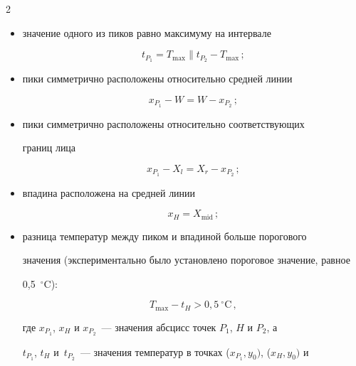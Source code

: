 \begin{multicols}{2}
\begin{itemize}
\item значение одного из пиков равно максимуму на интервале





\noindent


$$


t_{P_1}=T_{\max}\parallel t_{P_2} -T_{\max}\,;


$$


\item пики симметрично расположены относительно средней линии





\noindent


$$


x_{P_1}-W=W-x_{P_2}\,;


$$


\item пики симметрично расположены относительно соответствующих 


границ лица





\noindent


$$


x_{P_1}-X_l=X_r-x_{P_2}\,;


$$


\item впадина расположена на средней линии





\noindent


$$


x_H=X_{\mathrm{mid}}\,;


$$


\item разница температур между пиком и впадиной больше порогового 


значения (экспериментально было установлено пороговое значение, равное 


0,5~$^\circ$C):





\noindent


$$


T_{\max}-t_H>0{,}5~^\circ\mathrm{C}\,,


$$


где $x_{P_1}$, $x_H$ и $x_{P_2}$~--- значения абсцисс точек $P_1$, $H$ и $P_2$, а


$t_{P_1}$, $t_H$ и~$t_{P_2}$~--- значения температур в точках ($x_{P_1}, y_0)$, ($x_H, y_0)$ и



\end{itemize}
\end{multicols}
